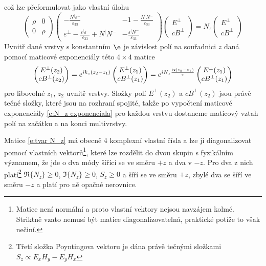 což lze přeformulovat jako vlastní úlohu
\begin{equation} \label{e:tvar N_z}
\begin{pmatrix}
\rho & 0 \\ 0 & \rho
\end{pmatrix}
\begin{pmatrix}
-\frac{N^\vert \varepsilon^-}{\varepsilon_{33}} & -1 - \frac{N^\vert N^- }{\varepsilon_{33}} \\
\varepsilon^\perp-\frac{\varepsilon^\vert \varepsilon^-}{\varepsilon_{33}}+N^\vert N^- & - \frac{\varepsilon^\vert N^-}{\varepsilon_{33}}
\end{pmatrix} 
\begin{pmatrix} E^\perp \\ cB^\perp \end{pmatrix}
=N_z \begin{pmatrix} E^\perp \\ cB^\perp \end{pmatrix}
\end{equation}
Uvnitř dané vrstvy s konstantním $\e$ je závislost polí na souřadnici $z$ daná pomocí maticové exponenciály této $4\times 4$ matice
\begin{equation} \label{e:N_z exponenciala}
\begin{pmatrix} E^\perp(z_2) \\ cB^\perp(z_2) \end{pmatrix} = e^{ik_z(z_2-z_1)} \begin{pmatrix} E^\perp(z_1) \\ cB^\perp(z_1) \end{pmatrix} =
e^{iN_z\frac{\w(z_2-z_1)}{c}} \begin{pmatrix} E^\perp(z_1) \\ cB^\perp(z_1) \end{pmatrix}
\end{equation}
pro libovolné $z_1$, $z_2$ uvnitř vrstvy.
Složky polí $E^\perp(z_2)$ a $cB^\perp(z_2)$ jsou právě tečné složky, které jsou na rozhraní spojité, takže po vypočtení maticové exponenciály \eqref{e:N_z exponenciala} pro každou vrstvu dostaneme maticový vztah polí na začátku a na konci multivrstvy.

Matice \eqref{e:tvar N_z} má obecně 4 komplexní vlastní čísla a lze ji diagonalizovat pomocí vlastních vektorů\footnote{Matice není normální a proto vlastní vektory nejsou navzájem kolmé. Striktně vzato nemusí být matice diagonalizovatelná, praktické potíže to však nečiní.}, které lze rozdělit do dvou skupin s fyzikálním významem, že jde o dva módy šířící se ve směru $+z$ a dva v $-z$. Pro dva z nich platí\footnote{Třetí složka Poyntingova vektoru je dána právě tečnými složkami $S_z\propto E_xH_y-E_yH_x$} $\Re\lbrace N_z \rbrace\geq0$, $\Im\lbrace N_z \rbrace\geq0$, $S_z\geq0$ a šíří se ve směru $+z$, zbylé dva se šíří ve směru $-z$ a platí pro ně opačné nerovnice.

